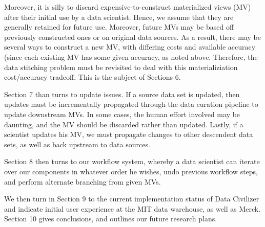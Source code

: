 Moreover, it is silly to discard expensive-to-construct materialized views (MV)
after their initial use by a data scientist.  Hence, we assume that they are
generally retained for future use.  Moreover, future MVs may be based off
previously constructed ones or on original data sources.  As a result, there may
be several ways to construct a new MV, with differing costs and available
accuracy (since each existing MV has some given accuracy, as noted above.
Therefore, the data stitching problem must be revisited to deal with this
materializiation cost/accuracy tradeoff.  This is the subject of Sections 6.

Section 7 than turns to update issues.   If a source data set is updated, then
updates must be incrementally propagated through the data curation pipeline to
update downstream MVs.  In some cases, the human effort involved may be
daunting, and the MV should be discarded rather than updated.  Lastly, if a
scientist updates his MV, we must propagate changes to other descendent data
sets, as well as back upstream to data sources. 

Section 8 then turns to our workflow system, whereby a data scientist can
iterate over our components in whatever order he wishes, undo previous workflow
steps, and perform alternate branching from given MVs. 

We then turn in Section 9 to the current implementation status of Data Civilizer
and indicate initial user experience at the MIT data warehouse, as well as
Merck.  Section 10 gives conclusions, and outlines our future research plans.

